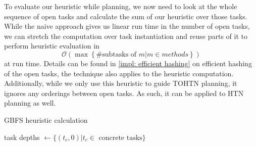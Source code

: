 To evaluate our heuristic while planning, we now need to look at the whole sequence of open tasks and calculate the sum of our heuristic over those tasks. While the naive approach gives us linear run time in the number of open tasks, we can stretch the computation over task instantiation and reuse parts of it to perform heuristic evaluation in
\[
\mathcal{O}\left(\max \left\{ \# \text{subtasks of } m | m \in methods \right\} \right)
\] at run time. Details can be found in \ref{impl: efficient hashing} on efficient hashing of the open tasks, the technique also applies to the heuristic computation. Additionally, while we only use this heuristic to guide TOHTN planning, it ignores any orderings between open tasks. As such, it can be applied to HTN planning as well.

\begin{algorithm}
	\caption{GBFS heuristic calculation}
	\label{algo: gbfs heuristic}
	task depths $\gets \{(t_c, 0) | t_c \in \text{ concrete tasks}\}$\;
\end{algorithm}
